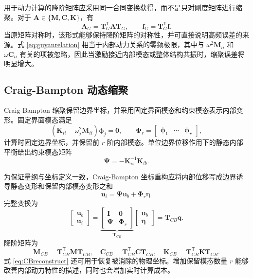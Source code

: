 \documentclass[UTF8,11pt,a4paper]{ctexart}
\newenvironment{addedblock}{\begingroup\color{addedred}}{\endgroup}
\begin{document}
\begin{addedblock}
用于动力计算的降阶矩阵应采用同一合同变换获得，而不是只对刚度矩阵进行缩聚。对于 $\bm A\in\{\bm M,\bm C,\bm K\}$，有
\begin{equation}
\bm A_G=\bm T_G^{\mathsf T}\bm A\bm T_G,
\qquad
\bm f_G=\bm T_G^{\mathsf T}\bm f.
\label{eq:guyanreduced}
\end{equation}
当原矩阵对称时，该形式能够保持降阶矩阵的对称性，并可直接说明高频误差的来源。式 \eqref{eq:guyanrelation} 相当于内部动力关系的零频极限，其中与 $\omega^2\bm M_{ii}$ 和 $\omega\bm C_{ii}$ 有关的项被忽略，因此当激励接近内部模态或整体结构共振时，缩聚误差将明显增大。
\end{addedblock}

\subsection{Craig-Bampton 动态缩聚}

Craig-Bampton 缩聚保留边界坐标，并采用固定界面模态和约束模态表示内部变形。固定界面模态满足
\begin{equation}
\left(\bm K_{ii}-\omega_j^2\bm M_{ii}\right)\bm\phi_j=\bm 0,
\qquad
\bm\Phi_r=\begin{bmatrix}\bm\phi_1&\cdots&\bm\phi_r\end{bmatrix},
\label{eq:fixedmodes}
\end{equation}
计算时固定边界坐标，并保留前 $r$ 阶内部模态。单位边界位移作用下的静态内部平衡给出约束模态矩阵
\begin{equation}
\bm\Psi=-\bm K_{ii}^{-1}\bm K_{ib}.
\label{eq:constraintmodes}
\end{equation}

\begin{addedblock}
为保证量纲与坐标定义一致，Craig-Bampton 坐标重构应将内部位移写成边界诱导静态变形和保留内部模态变形之和
\begin{equation}
\bm u_i=\bm\Psi\bm u_b+\bm\Phi_r\bm\eta.
\label{eq:CBreconstruct}
\end{equation}
完整变换为
\begin{equation}
\begin{bmatrix}\bm u_b\\\bm u_i\end{bmatrix}
=
\underbrace{\begin{bmatrix}
\bm I&\bm 0\\
\bm\Psi&\bm\Phi_r
\end{bmatrix}}_{\bm T_{CB}}
\begin{bmatrix}\bm u_b\\\bm\eta\end{bmatrix}
=\bm T_{CB}\bm q.
\label{eq:TCB}
\end{equation}
降阶矩阵为
\begin{equation}
\bm M_{CB}=\bm T_{CB}^{\mathsf T}\bm M\bm T_{CB},\quad
\bm C_{CB}=\bm T_{CB}^{\mathsf T}\bm C\bm T_{CB},\quad
\bm K_{CB}=\bm T_{CB}^{\mathsf T}\bm K\bm T_{CB}.
\label{eq:CBreduced}
\end{equation}
式 \eqref{eq:CBreconstruct} 还可用于恢复被消除的物理坐标。增加保留模态数量 $r$ 能够改善内部动力特性的描述，同时也会增加实时计算成本。
\end{addedblock}
\end{document}
